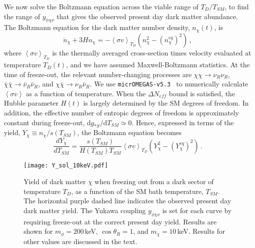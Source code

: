 \documentclass[aps, prd, reprint, nofootinbib, amsmath, amssymb, floatfix]{revtex4-2}
\begin{document}
We now solve the Boltzmann equation across the viable range of $T_D/T_{SM}$, to find the range of $y_{\phi\chi\nu}$ that gives the observed present day dark matter abundance. The Boltzmann equation for the dark matter number density, $n_\chi(t)$, is
%
\begin{equation}
    \dot{n}_\chi + 3H n_\chi = -\left<\sigma v\right>_{T_D}\left(n_\chi^2 - (n_\chi^{eq})^2\right) \,,
\end{equation}
%
where $\left<\sigma v\right>_{T_D}$ is the thermally averaged cross-section times velocity evaluated at temperature $T_D(t)$, and we have assumed Maxwell-Boltzmann statistics. At the time of freeze-out, the relevant number-changing processes are $\chi\chi\to\nu_R\nu_R$, $\bar{\chi}\bar{\chi}\to\bar{\nu}_R\bar{\nu}_R$, and $\chi\bar{\chi}\to\nu_R\bar{\nu}_R$. We use \texttt{micrOMEGAS-v5.3}~\cite{Alguero:2022inz} to numerically calculate $\left<\sigma v\right>$ as a function of temperature. When the $\Delta N_{eff}$ bound is satisfied, the Hubble parameter $H(t)$ is largely determined by the SM degrees of freedom. In addition, the effective number of entropic degrees of freedom is approximately constant during freeze-out, $\mathrm{d}g_{*S}/\mathrm{d}T_{SM} \simeq 0$. Hence, expressed in terms of the yield, $Y_{\chi} \equiv n_\chi/s(T_{SM})$, the Boltzmann equation becomes
%
\begin{equation}
    \frac{dY_\chi}{dT_{SM}} = \frac{s(T_{SM})}{H(T_{SM})T_{SM}}\left<\sigma v\right>_{T_D}\left(Y_\chi^2 - \left(Y_\chi^{eq}\right)^2\right) \,.
\end{equation}

\begin{figure}
    \texttt{[image: Y\_sol\_10keV.pdf]}
    \caption{\label{fig:Y_sol} Yield of dark matter $\chi$ when freezing out from a dark sector of temperature $T_D$, as a function of the SM bath temperature, $T_{SM}$. The horizontal purple dashed line indicates the observed present day dark matter yield. The Yukawa coupling $y_{\phi\chi\nu}$ is set for each curve by requiring freeze-out at the correct present day yield. Results are shown for $m_\phi = 200$\,keV, $\cos\theta_R = 1$, and $m_\chi=10$\,keV. Results for other values are discussed in the text.}
\end{figure}
\end{document}

